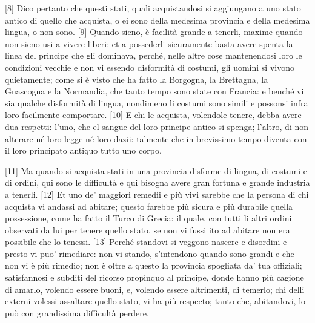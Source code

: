 {[}8{]} Dico pertanto che questi stati, quali acquistandosi si
aggiungano a uno stato antico di quello che acquista, o ei sono della
medesima provincia e della medesima lingua, o non sono. {[}9{]} Quando
sieno, è facilità grande a tenerli, maxime quando non sieno usi a vivere
liberi: et a possederli sicuramente basta avere spenta la linea del
principe che gli dominava, perché, nelle altre cose mantenendosi loro le
condizioni vecchie e non vi essendo disformità di costumi, gli uomini si
vivono quietamente; come si è visto che ha fatto la Borgogna, la
Brettagna, la Guascogna e la Normandia, che tanto tempo sono state con
Francia: e benché vi sia qualche disformità di lingua, nondimeno li
costumi sono simili e possonsi infra loro facilmente comportare.
{[}10{]} E chi le acquista, volendole tenere, debba avere dua respetti:
l'uno, che el sangue del loro principe antico si spenga; l'altro, di non
alterare né loro legge né loro dazii: talmente che in brevissimo tempo
diventa con il loro principato antiquo tutto uno corpo.

{[}11{]} Ma quando si acquista stati in una provincia disforme di
lingua, di costumi e di ordini, qui sono le difficultà e qui bisogna
avere gran fortuna e grande industria a tenerli. {[}12{]} Et uno de'
maggiori remedii e più vivi sarebbe che la persona di chi acquista vi
andassi ad abitare; questo farebbe più sicura e più durabile quella
possessione, come ha fatto il Turco di Grecia: il quale, con tutti li
altri ordini observati da lui per tenere quello stato, se non vi fussi
ito ad abitare non era possibile che lo tenessi. {[}13{]} Perché
standovi si veggono nascere e disordini e presto vi puo' rimediare: non
vi stando, s'intendono quando sono grandi e che non vi è più rimedio;
non è oltre a questo la provincia spogliata da' tua offiziali;
satisfannosi e subditi del ricorso propinquo al principe, donde hanno
più cagione di amarlo, volendo essere buoni, e, volendo essere
altrimenti, di temerlo; chi delli externi volessi assaltare quello
stato, vi ha più respecto; tanto che, abitandovi, lo può con grandissima
difficultà perdere.

